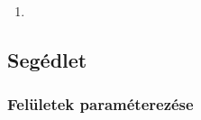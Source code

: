 \documentclass{szb-practice}
\begin{document}
\begin{enumerate}
  \item





\end{enumerate}

\clearpage
\subsection{Segédlet}

\subsubsection{Felületek paraméterezése}
\end{document}
